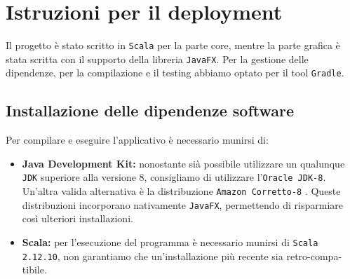 \section{Istruzioni per il deployment}
	Il progetto è stato scritto in \texttt{Scala} per la parte core, mentre la parte grafica è stata scritta con il supporto della libreria \texttt{JavaFX}.
	Per la gestione delle dipendenze, per la compilazione e il testing abbiamo optato per il tool \texttt{Gradle}.

	\subsection{Installazione delle dipendenze software}
	 Per compilare e eseguire l'applicativo è necessario munirsi di:
	 \begin{itemize}
	 	\item \textbf{Java Development Kit:}
	 		nonostante sià possibile utilizzare un qualunque \texttt{JDK} superiore alla versione 8, consigliamo di utilizzare l'\texttt{Oracle JDK-8}.
	 		Un'altra valida alternativa è la distribuzione \texttt{Amazon Corretto-8} \cite{AmazonCorrettoSite}. Queste distribuzioni incorporano nativamente \texttt{JavaFX}, permettendo di risparmiare così ulteriori installazioni.
	 		
	 	\item \textbf{Scala:} per l'esecuzione del programma è necessario munirsi di \texttt{Scala 2.12.10}, non garantiamo che un'installazione più recente sia retro-compa-tibile.
	 	 
	 \end{itemize}
 		
